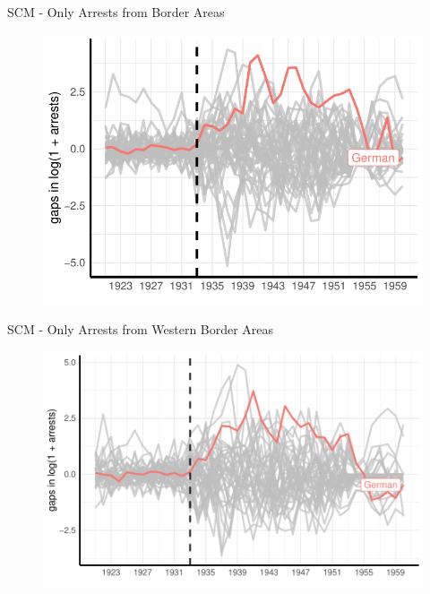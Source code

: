 \documentclass[11pt]{beamer}
\begin{document}
\begin{frame}[label=sc_border_area]{SCM - Only Arrests from Border Areas}
 \begin{figure}[h]
\centering
\includegraphics[width=1\textwidth]{placebo_highlight_all_border_provinces.pdf}
\end{figure}
\hyperlink{sc_robustness_checks}{}
\end{frame}

\begin{frame}[label=sc_border_area_west]{SCM - Only Arrests from Western Border Areas}
 \begin{figure}[h]
\centering
\includegraphics[width=1\textwidth]{placebo_highlight_all_border_provinces_western.pdf}
\end{figure}
\hyperlink{add_content}{}
\end{frame}
\end{document}
